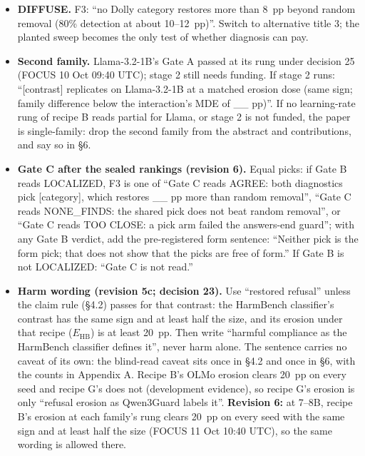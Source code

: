 \documentclass{article}
\theoremstyle{plain}
\theoremstyle{definition}
\theoremstyle{remark}
\begin{document}
\begin{itemize}
        is reported as a construction check, published before the pilot, never
        as a find. \textbf{Revision 6g (the lead's rulings 3 and 4):} if the
        Self-Inf-N-style scorer is not committed before Gate B's category runs,
        only A1 can; A1's find is its rank under the PKU-SafeRLHF anchors, with
        its rank under the disjoint-source anchors beside it as a sensitivity.
  \item \textbf{DIFFUSE.} F3: ``no Dolly category restores more than 8~pp beyond
        random removal (80\% detection at about 10--12~pp)''. Switch to
        alternative title 3; the planted sweep becomes the only test of whether
        diagnosis can pay.
  \item \textbf{Second family.} Llama-3.2-1B's Gate A passed at its rung under
        decision 25 (FOCUS 10 Oct 09:40 UTC); stage 2 still needs funding. If
        stage 2 runs: ``[contrast] replicates on Llama-3.2-1B at a matched
        erosion dose (same sign; family difference below the interaction's MDE
        of \_\_ pp)''. If no learning-rate rung of recipe B reads partial for
        Llama, or stage 2 is not funded, the paper is single-family: drop the
        second family from the abstract and contributions, and say so in \S{}6.
  \item \textbf{Gate C after the sealed rankings (revision 6).} Equal picks: if
        Gate B reads LOCALIZED, F3 is one of ``Gate C reads AGREE: both
        diagnostics pick [category], which restores \_\_ pp more than random
        removal'', ``Gate C reads NONE\_FINDS: the shared pick does not beat
        random removal'', or ``Gate C reads TOO CLOSE: a pick arm failed the
        answers-end guard''; with any Gate B verdict, add the pre-registered
        form sentence: ``Neither pick is the form pick; that does not show that
        the picks are free of form.'' If Gate B is not LOCALIZED: ``Gate C is
        not read.''
  \item \textbf{Harm wording (revision 5c; decision 23).} Use ``restored
        refusal'' unless the claim rule (\S{}4.2) passes for that contrast: the
        HarmBench classifier's contrast has the same sign and at least half the
        size, and its erosion under that recipe ($E_{\mathrm{HB}}$) is at least
        20~pp. Then write ``harmful compliance as the HarmBench classifier
        defines it'', never harm alone. The sentence carries no caveat of its
        own: the blind-read caveat sits once in \S{}4.2 and once in \S{}6, with
        the counts in Appendix A. Recipe B's OLMo erosion clears 20~pp on every
        seed and recipe G's does not (development evidence), so recipe G's
        erosion is only ``refusal erosion as Qwen3Guard labels it''.
        \textbf{Revision 6:} at 7--8B, recipe B's erosion at each family's rung
        clears 20~pp on every seed with the same sign and at least half the size
        (FOCUS 11 Oct 10:40 UTC), so the same wording is allowed there.
\end{itemize}
\end{document}
